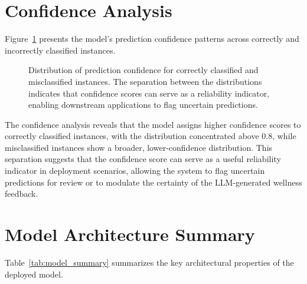 \documentclass[12pt,letterpaper]{report}
\begin{document}
\section{Confidence Analysis}
\label{sec:confidence}

Figure~\ref{fig:confidence} presents the model's prediction confidence patterns across correctly and incorrectly classified instances.

\begin{figure}[H]
\centering
{}
\caption[Model confidence analysis]{Distribution of prediction confidence for correctly classified and misclassified instances. The separation between the distributions indicates that confidence scores can serve as a reliability indicator, enabling downstream applications to flag uncertain predictions.}
\label{fig:confidence}
\end{figure}

The confidence analysis reveals that the model assigns higher confidence scores to correctly classified instances, with the distribution concentrated above 0.8, while misclassified instances show a broader, lower-confidence distribution. This separation suggests that the confidence score can serve as a useful reliability indicator in deployment scenarios, allowing the system to flag uncertain predictions for review or to modulate the certainty of the LLM-generated wellness feedback.

\section{Model Architecture Summary}
\label{sec:model_summary}

Table~\ref{tab:model_summary} summarizes the key architectural properties of the deployed model.
\end{document}
